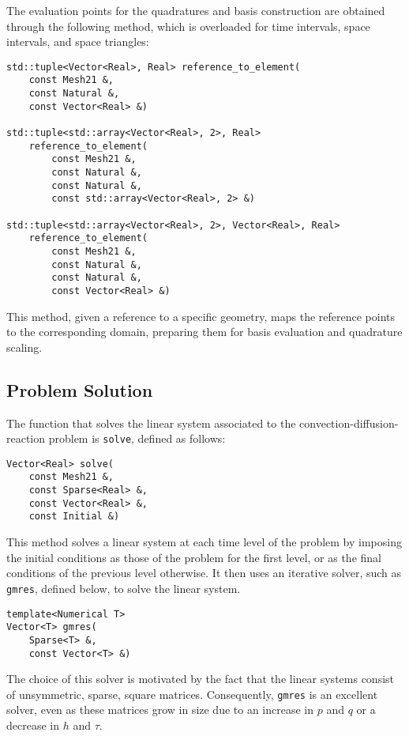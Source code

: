 The evaluation points for the quadratures and basis construction are obtained through the following method, which is overloaded for time intervals, space intervals, and space triangles:
\begin{lstlisting}[style=cpp]
std::tuple<Vector<Real>, Real> reference_to_element(
    const Mesh21 &, 
    const Natural &, 
    const Vector<Real> &)

std::tuple<std::array<Vector<Real>, 2>, Real> 
    reference_to_element(
        const Mesh21 &, 
        const Natural &, 
        const Natural &, 
        const std::array<Vector<Real>, 2> &)

std::tuple<std::array<Vector<Real>, 2>, Vector<Real>, Real> 
    reference_to_element(
        const Mesh21 &, 
        const Natural &, 
        const Natural &, 
        const Vector<Real> &)
\end{lstlisting}
This method, given a reference to a specific geometry, maps the reference points to the corresponding domain, preparing them for basis evaluation and quadrature scaling.

\newpage
\subsection{Problem Solution}

The function that solves the linear system associated to the convection-diffusion-reaction problem is \lstinline{solve}, defined as follows:
\begin{lstlisting}[style=cpp]
Vector<Real> solve(
    const Mesh21 &, 
    const Sparse<Real> &, 
    const Vector<Real> &, 
    const Initial &)
\end{lstlisting}

This method solves a linear system at each time level of the problem by imposing the initial conditions as those of the problem for the first level, or as the final conditions of the previous level otherwise. It then uses an iterative solver, such as \lstinline{gmres}, defined below, to solve the linear system.

\begin{lstlisting}[style=cpp]
template<Numerical T>
Vector<T> gmres(
    Sparse<T> &,
    const Vector<T> &)
\end{lstlisting}

The choice of this solver is motivated by the fact that the linear systems consist of unsymmetric, sparse, square matrices. Consequently, \lstinline{gmres} is an excellent solver, even as these matrices grow in size due to an increase in $p$ and $q$ or a decrease in $h$ and $\tau$.

